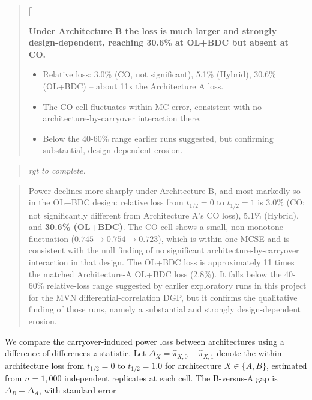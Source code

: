\documentclass[
  11pt,
]{article}
\newcounter{pgraph}
\newenvironment{bullets}{%
  \stepcounter{pgraph}%
  \begin{quote}\small\sffamily\color[gray]{0.30}%
  {\normalfont\scriptsize\color[gray]{0.58}[\thepgraph]\enspace}}{%
  \end{quote}}
\newenvironment{rgt}{%
  \begin{quote}\small\itshape\color[RGB]{20,60,160}}{%
  \end{quote}}
\newenvironment{orig}{%
  \begin{quote}\normalsize\color[gray]{0.55}}{%
  \end{quote}}
\begin{document}
\begin{bullets}

\textbf{Under Architecture B the loss is much larger and strongly
design-dependent, reaching 30.6\% at OL+BDC but absent at CO.}

\begin{itemize}\setlength{\itemsep}{2pt}\setlength{\parskip}{0pt}
\item Relative loss: 3.0\% (CO, not significant), 5.1\% (Hybrid),
30.6\% (OL+BDC) -- about 11x the Architecture A loss.
\item The CO cell fluctuates within MC error, consistent with no
architecture-by-carryover interaction there.
\item Below the 40-60\% range earlier runs suggested, but confirming
substantial, design-dependent erosion.
\end{itemize}

\end{bullets}

\begin{rgt}
rgt to complete.

\end{rgt}

\begin{orig}
Power declines more sharply under Architecture B, and most markedly so
in the OL+BDC design: relative loss from \(t_{1/2} = 0\) to
\(t_{1/2} = 1\) is 3.0\% (CO; not significantly different from
Architecture A's CO loss), 5.1\% (Hybrid), and \textbf{30.6\% (OL+BDC)}.
The CO cell shows a small, non-monotone fluctuation
(\(0.745 \to 0.754 \to 0.723\)), which is within one MCSE and is
consistent with the null finding of no significant
architecture-by-carryover interaction in that design. The OL+BDC loss is
approximately 11 times the matched Architecture-A OL+BDC loss (2.8\%).
It falls below the 40-60\% relative-loss range suggested by earlier
exploratory runs in this project for the MVN differential-correlation
DGP, but it confirms the qualitative finding of those runs, namely a
substantial and strongly design-dependent erosion.

\end{orig}

We compare the carryover-induced power loss between architectures using
a difference-of-differences \(z\)-statistic. Let
\(\Delta_X = \hat{\pi}_{X,0} - \hat{\pi}_{X,1}\) denote the
within-architecture loss from \(t_{1/2} = 0\) to \(t_{1/2} = 1.0\) for
architecture \(X \in \{A, B\}\), estimated from \(n = 1{,}000\)
independent replicates at each cell. The B-versus-A gap is
\(\Delta_B - \Delta_A\), with standard error
\end{document}
